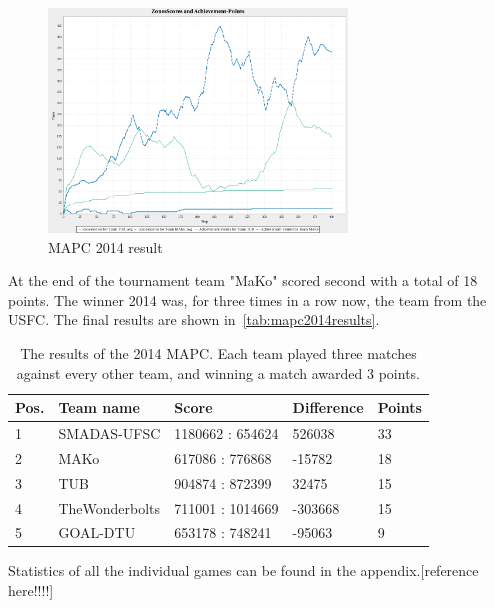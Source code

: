 \begin{figure}[h]
	\centering
	\includegraphics[width=300px]{images/ZonesScoresAndAchievementPoints.png}
	\caption{MAPC 2014 result}
	\label{dis:ZonesScoresAndAchievementPoints}
\end{figure}
At the end of the tournament team "MaKo" scored second with a total of 18 points. The winner 2014 was, for three times in a row now, the team from the USFC. The final results are shown in~\autoref{tab:mapc2014results}.
\begin{table}[ht]
\centering
\caption{The results of the 2014 MAPC. Each team played three matches against every other team, and winning a match awarded 3 points.}
\label{tab:mapc2014results}
\begin{tabular}{@{}lllll@{}}
\toprule
Pos. & Team name      & Score            & Difference            & Points \\ \midrule
1    & SMADAS-UFSC    & 1180662 : 654624 & \phantom{-}526038     & 33     \\
2    & MAKo           & 617086 : 776868  & -15782                & 18     \\
3    & TUB            & 904874 : 872399  & \phantom{-}32475      & 15     \\
4    & TheWonderbolts & 711001 : 1014669 & -303668               & 15     \\
5    & GOAL-DTU       & 653178 : 748241  & -95063                & 9      \\ \bottomrule
\end{tabular}
\end{table}
Statistics of all the individual games can be found in the appendix.[reference here!!!!]

